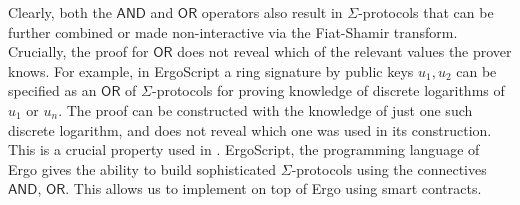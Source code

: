 \documentclass[11pt]{article}
\newcommand{\langname}{ErgoScript\xspace}
\newcommand{\andnode}{\ensuremath{\mathsf{AND}}}
\newcommand{\ornode}{\ensuremath{\mathsf{OR}}}
\begin{document}
Clearly, both the $\andnode$ and $\ornode$ operators also result in $\Sigma$-protocols that can be further combined or made non-interactive via the Fiat-Shamir transform. Crucially, the proof for $\ornode$ does not reveal which of the relevant values the prover knows. For example, in \langname a ring signature by public keys $u_1, u_2$ can be specified as an $\ornode$ of $\Sigma$-protocols for proving knowledge of discrete logarithms of $u_1$ or $u_n$. The proof can be constructed with the knowledge of just one such discrete logarithm, and does not reveal which one was used in its construction. This is a crucial property used in \algname.
\langname, the programming language of Ergo gives the ability to build sophisticated $\Sigma$-protocols using the connectives $\andnode$, $\ornode$. This allows us to implement \algname on top of Ergo using smart contracts. 
\end{document}
